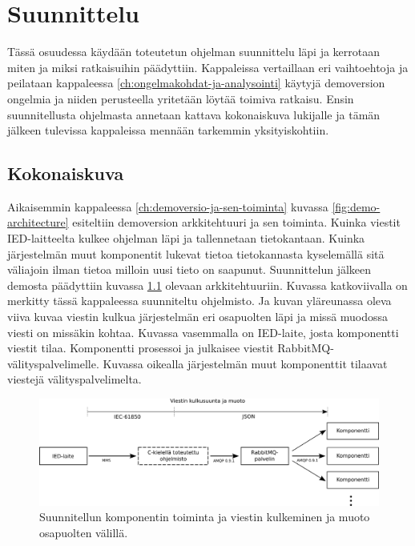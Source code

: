 \chapter{Suunnittelu}
\label{ch:suunnittelu}
Tässä osuudessa käydään toteutetun ohjelman suunnittelu läpi ja kerrotaan miten ja miksi ratkaisuihin päädyttiin. Kappaleissa vertaillaan eri vaihtoehtoja ja peilataan kappaleessa \ref{ch:ongelmakohdat-ja-analysointi} käytyjä demoversion ongelmia ja niiden perusteella yritetään löytää toimiva ratkaisu. Ensin suunnitellusta ohjelmasta annetaan kattava kokonaiskuva lukijalle ja tämän jälkeen tulevissa kappaleissa mennään tarkemmin yksityiskohtiin.


\section{Kokonaiskuva}
Aikaisemmin kappaleessa \ref{ch:demoversio-ja-sen-toiminta} kuvassa \ref{fig:demo-architecture} esiteltiin demoversion arkkitehtuuri ja sen toiminta. Kuinka viestit IED-laitteelta kulkee ohjelman läpi ja tallennetaan tietokantaan. Kuinka järjestelmän muut komponentit lukevat tietoa tietokannasta kyselemällä sitä väliajoin ilman tietoa milloin uusi tieto on saapunut. Suunnittelun jälkeen demosta päädyttiin kuvassa \ref{fig:planned-system-architecture} olevaan arkkitehtuuriin. Kuvassa katkoviivalla on merkitty tässä kappaleessa suunniteltu ohjelmisto. Ja kuvan yläreunassa oleva viiva kuvaa viestin kulkua järjestelmän eri osapuolten läpi ja missä muodossa viesti on missäkin kohtaa. Kuvassa vasemmalla on IED-laite, josta komponentti viestit tilaa. Komponentti prosessoi ja julkaisee viestit RabbitMQ-välityspalvelimelle. Kuvassa oikealla järjestelmän muut komponenttit tilaavat viestejä välityspalvelimelta.

\begin{figure}[ht!]
	\includegraphics[width=1\textwidth]{pictures/planned-system-architecture.png}
	\caption{Suunnitellun komponentin toiminta ja viestin kulkeminen ja muoto osapuolten välillä.}
	\label{fig:planned-system-architecture}
\end{figure}

